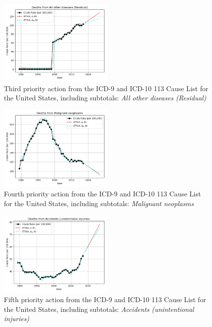 \documentclass[10pt, a4paper, twocolumn]{IEEEconf}
\begin{document}
\begin{figure}[H]
  \centering
  \includegraphics[width=0.5\textwidth]{results/US_ICD_113_SELECTED_CAUSES_ALL/All_other_diseases_Residual_ets.png}
  \caption{Third priority action from the ICD-9 and ICD-10 113 Cause List for the United States, including subtotals: \textit{All other diseases (Residual)}}\label{fig:k3c}
\end{figure}

\begin{figure}[H]
  \centering
  \includegraphics[width=0.5\textwidth]{results/US_ICD_113_SELECTED_CAUSES_ALL/Malignant_neoplasms_ets.png}
  \caption{Fourth priority action from the ICD-9 and ICD-10 113 Cause List for the United States, including subtotals: \textit{Malignant neoplasms}}\label{fig:k3d}
\end{figure}

\begin{figure}[H]
  \centering
  \includegraphics[width=0.5\textwidth]{results/US_ICD_113_SELECTED_CAUSES_ALL/Accidents_unintentional_injuries_ets.png}
  \caption{Fifth priority action from the ICD-9 and ICD-10 113 Cause List for the United States, including subtotals: \textit{Accidents (unintentional injuries)}}\label{fig:k3e}
\end{figure}
\end{document}

